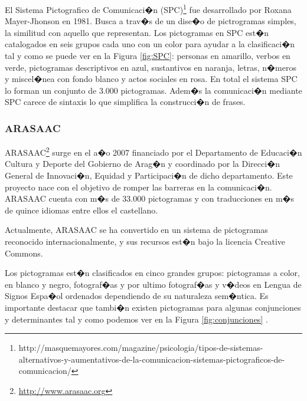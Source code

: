El Sistema Pictografico de Comunicaci�n (SPC)\footnote{http://masquemayores.com/magazine/psicologia/tipos-de-sistemas-alternativos-y-aumentativos-de-la-comunicacion-sistemas-pictograficos-de-comunicacion/} fue desarrollado por Roxana Mayer-Jhonson en 1981. Busca a trav�s de un dise�o de pictrogramas simples, la similitud con aquello que representan. Los pictogramas en SPC est�n catalogados en seis grupos cada uno con un color para ayudar a la clasificaci�n tal y como se puede ver en la Figura \ref{fig:SPC}: personas en amarillo, verbos en verde, pictogramas descriptivos en azul, sustantivos en naranja, letras, n�meros  y miscel�nea con fondo blanco y actos sociales en rosa. En total el sistema SPC lo forman un conjunto de 3.000 pictogramas. Adem�s la comunicaci�n mediante SPC carece de sintaxis lo que simplifica la construcci�n de frases.


\subsubsection{ARASAAC}

\label{cap2:sec:Arasaac}

ARASAAC\footnote{\url{http://www.arasaac.org}} surge en el a�o 2007 financiado por el Departamento de Educaci�n Cultura y Deporte del Gobierno de Arag�n y coordinado por la Direcci�n General de Innovaci�n, Equidad y Participaci�n de dicho departamento. Este proyecto nace con el objetivo de romper las barreras en la comunicaci�n.
ARASAAC cuenta con m�s de 33.000 pictogramas y con traducciones en m�s de quince idiomas entre ellos el castellano.

Actualmente, ARASAAC se ha convertido en un sistema de pictogramas reconocido internacionalmente, y sus recursos est�n bajo la licencia Creative Commons. 

Los pictogramas est�n clasificados en cinco grandes grupos: pictogramas a color, en blanco y negro, fotograf�as y por ultimo fotograf�as y v�deos en Lengua de Signos Espa�ol ordenados dependiendo de su naturaleza sem�ntica\citep{Bertola2018}. Es importante destacar que tambi�n existen pictogramas para algunas conjunciones y determinantes tal y como podemos ver en la Figura \ref{fig:conjunciones}
.

